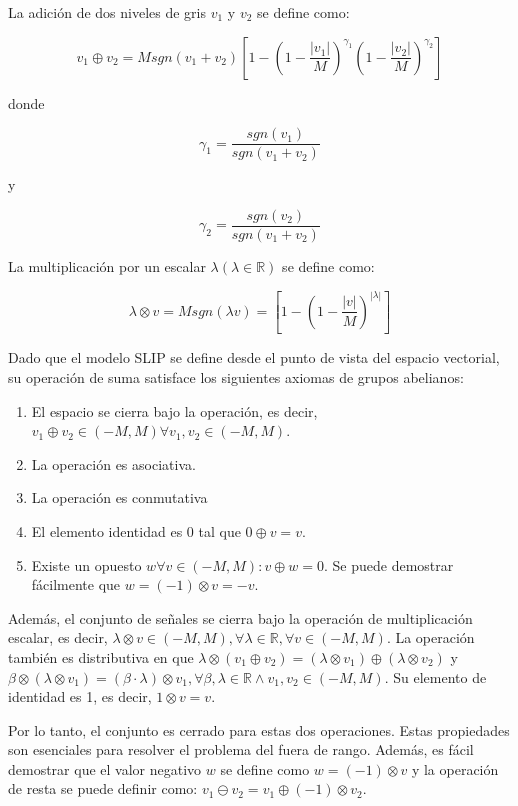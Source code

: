 La adición de dos niveles de gris $v_1$ y $v_2$ se define como:

\begin{equation}
	v_1\oplus v_2=Msgn(v_1+v_2)\left[1-\left(1-\frac{|v_1|}{M}\right)^{\gamma_1}\left(1-\frac{|v_2|}{M}\right)^{\gamma_2}\right]
\end{equation}

donde

\begin{equation}
	\gamma_1=\frac{sgn(v_1)}{sgn(v_1+v_2)}
\end{equation}

y

\begin{equation}
	\gamma_2=\frac{sgn(v_2)}{sgn(v_1+v_2)}
\end{equation}

La multiplicación por un escalar $\lambda (\lambda \in \mathbb{R})$ se define como:

\begin{equation}
	\lambda \otimes v = Msgn(\lambda v)=\left[1-\left(1-\frac{|v|}{M}\right)^{|\lambda|}\right]
\end{equation}

Dado que el modelo SLIP se define desde el punto de vista del espacio vectorial, su operación de suma satisface los siguientes axiomas de grupos abelianos:

\begin{enumerate}
	\item El espacio se cierra bajo la operación, es decir, $v_1\oplus v_2 \in (-M, M ) \forall v_1, v_2 \in (-M, M )$.
	\item La operación es asociativa.
	\item La operación es conmutativa
	\item El elemento identidad es $0$ tal que $0\oplus v = v$.
	\item  Existe un opuesto $w \forall v \in (-M, M ): v \oplus w = 0$.  Se puede demostrar fácilmente que $w = (-1)\otimes v = -v $.
\end{enumerate}
  
Además, el conjunto de señales se cierra bajo la operación de multiplicación escalar, es decir, $\lambda \otimes v \in (-M, M), \forall \lambda \in \mathbb{R}, \forall v \in (-M, M)$. La operación también es distributiva en que $\lambda \otimes (v_1\oplus v_2) = (\lambda \otimes v_1 )\oplus (\lambda\otimes v_2)$ y $\beta\otimes (\lambda\otimes v_1 ) = (\beta \cdot \lambda)\otimes v_1, \forall \beta, \lambda \in \mathbb{R} \land v_1 , v_2 \in (-M, M)$. Su elemento de identidad es 1, es decir, $1\otimes v = v $.

Por lo tanto, el conjunto es cerrado para estas dos operaciones. Estas propiedades son esenciales para resolver el problema del fuera de rango. Además, es fácil demostrar que el valor negativo $w$ se define como $w = (-1)\otimes v$ y la operación de resta se puede definir como: $v_1\ominus v_2=v_1\oplus(-1)\otimes v_2$.